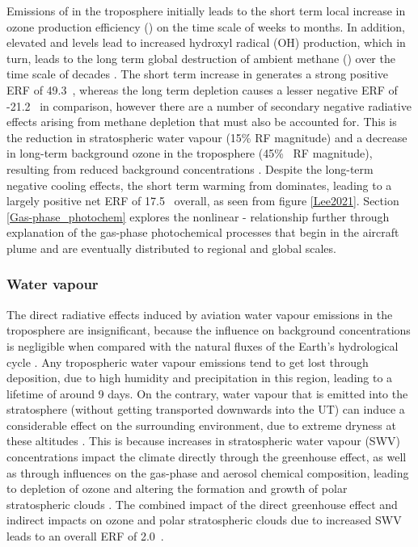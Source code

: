 Emissions of  in the troposphere initially leads to the short term local increase in ozone production efficiency () on the time scale of weeks to months. In addition, elevated  and  levels lead to increased hydroxyl radical (OH) production, which in turn, leads to the long term global destruction of ambient methane () over the time scale of decades \cite{Stevenson2004, Wild2001, Myhre2011}. The short term increase in  generates a strong positive ERF of 49.3~, whereas the long term  depletion causes a lesser negative ERF of -21.2~ in comparison, however there are a number of secondary negative radiative effects arising from methane depletion that must also be accounted for. This is the reduction in stratospheric water vapour (15\%  RF magnitude) and a decrease in long-term background ozone in the troposphere (45\%~ RF magnitude), resulting from reduced background  concentrations \cite{Holmes2011, Myhre2007}. Despite the long-term negative cooling effects, the short term warming from  dominates, leading to a largely positive net ERF of 17.5~ overall, as seen from figure \ref{Lee2021}. Section \ref{Gas-phase_photochem} explores the nonlinear - relationship further through explanation of the gas-phase photochemical processes that begin in the aircraft plume and are eventually distributed to regional and global scales. 

\subsubsection{Water vapour}
The direct radiative effects induced by aviation water vapour emissions in the troposphere are insignificant, because the influence on background concentrations is negligible when compared with the natural fluxes of the Earth's hydrological cycle \cite{IPCC1999}. Any tropospheric water vapour emissions tend to get lost through deposition, due to high humidity and precipitation in this region, leading to a lifetime of around 9 days. On the contrary, water vapour that is emitted into the stratosphere (without getting transported downwards into the UT) can induce a considerable effect on the surrounding environment, due to extreme dryness at these altitudes \cite{Jensen1996}. This is because increases in stratospheric water vapour (SWV) concentrations impact the climate directly through the greenhouse effect, as well as through influences on the gas-phase and aerosol chemical composition, leading to depletion of ozone and altering the formation and growth of polar stratospheric clouds \cite{Stenke2005}. The combined impact of the direct greenhouse effect and indirect impacts on ozone and polar stratospheric clouds due to increased SWV leads to an overall ERF of 2.0~.


